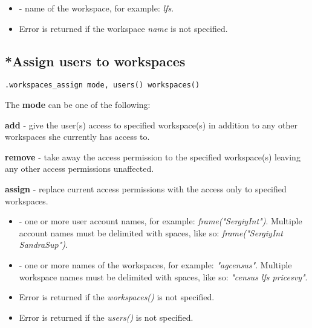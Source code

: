 \paramsheader
\begin{itemize}
\item {} - name of the workspace, for example: \textit{lfs}.
\end{itemize}

\errheader
\begin{itemize}
\item Error  is returned if the workspace \textit{name} is not specified.
\end{itemize}


\subsection{*Assign users to workspaces}

\begin{lstlisting}[style=CommandLineStyle]
.workspaces_assign mode, users() workspaces()
\end{lstlisting}

\vskip10pt
The \textbf{mode} can be one of the following:
\vskip10pt
\begin{compactitem}
  \item \textbf{add} - give the user(s) access to specified workspace(s)
                  in addition to any other workspaces she currently
                  has access to.
  \item \textbf{remove} - take away the access permission to the specified
                  workspace(s) leaving any other access permissions
                  unaffected.
  \item \textbf{assign} - replace current access permissions with the
                  access only to specified workspaces.
\end{compactitem}

\optsheader

\begin{itemize}
  \item {} - one or more user account names, for example:
        \textit{frame("SergiyInt")}. Multiple account names must be delimited
        with spaces, like so: \textit{frame("SergiyInt SandraSup")}.
  \item {} - one or more names of the workspaces, for
        example: \textit{"agcensus"}. Multiple workspace names must be
        delimited with spaces, like so: \textit{"census lfs pricesvy"}.
\end{itemize}

\errheader
\begin{itemize}
   \item Error  is returned if the \textit{workspaces()} is
         not specified.
   \item Error  is returned if the \textit{users()} is
         not specified.
\end{itemize}

